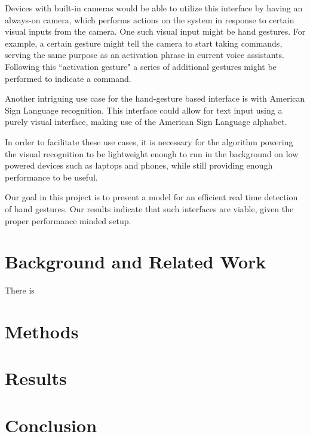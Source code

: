 \documentclass[10pt,twocolumn,letterpaper]{article}
\begin{document}
Devices with built-in cameras would be able to utilize this interface by having an always-on camera, which performs actions on the system in response to certain visual inputs from the camera. One such visual input might be hand gestures. For example, a certain gesture might tell the camera to start taking commands, serving the same purpose as an activation phrase in current voice assistants. Following this ``activation gesture" a series of additional gestures might be performed to indicate a command.

Another intriguing use case for the hand-gesture based interface is with American Sign Language recognition. This interface could allow for text input using a purely visual interface, making use of the American Sign Language alphabet.

In order to facilitate these use cases, it is necessary for the algorithm powering the visual recognition to be lightweight enough to run in the background on low powered devices such as laptops and phones, while still providing enough performance to be useful.

Our goal in this project is to present a model for an efficient real time detection of hand gestures. Our results indicate that such interfaces are viable, given the proper performance minded setup.


\section{Background and Related Work}

There is 

\section{Methods}
\section{Results}
\section{Conclusion}
\end{document}
